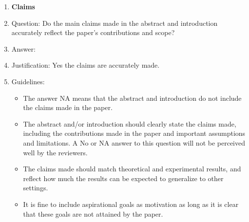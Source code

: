 \documentclass{article}
\begin{document}
\begin{enumerate}

\item {\bf Claims}
    \item[] Question: Do the main claims made in the abstract and introduction accurately reflect the paper's contributions and scope?
    \item[] Answer: \answerYes{} %
    \item[] Justification: Yes the claims are accurately made.
    \item[] Guidelines:
    \begin{itemize}
        \item The answer NA means that the abstract and introduction do not include the claims made in the paper.
        \item The abstract and/or introduction should clearly state the claims made, including the contributions made in the paper and important assumptions and limitations. A No or NA answer to this question will not be perceived well by the reviewers. 
        \item The claims made should match theoretical and experimental results, and reflect how much the results can be expected to generalize to other settings. 
        \item It is fine to include aspirational goals as motivation as long as it is clear that these goals are not attained by the paper. 
    \end{itemize}


\end{enumerate}
\end{document}
